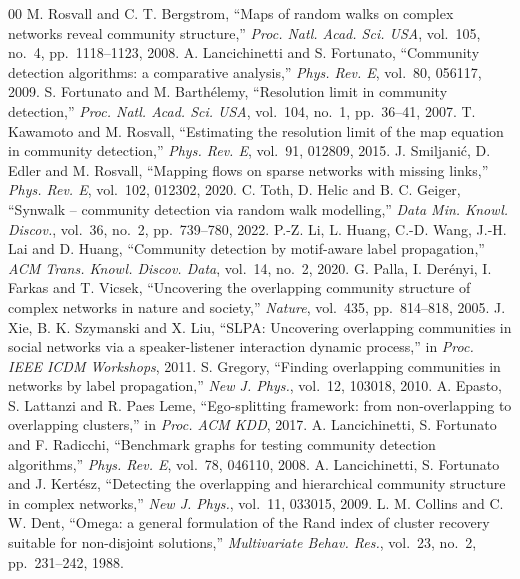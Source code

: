 \documentclass[conference]{IEEEtran}
\begin{document}
\begin{thebibliography}{00}
 M. Rosvall and C. T. Bergstrom, ``Maps of random walks on complex networks reveal community structure,'' \emph{Proc. Natl. Acad. Sci. USA}, vol.~105, no.~4, pp.~1118--1123, 2008.
 A. Lancichinetti and S. Fortunato, ``Community detection algorithms: a comparative analysis,'' \emph{Phys. Rev. E}, vol.~80, 056117, 2009.
 S. Fortunato and M. Barth\'elemy, ``Resolution limit in community detection,'' \emph{Proc. Natl. Acad. Sci. USA}, vol.~104, no.~1, pp.~36--41, 2007.
 T. Kawamoto and M. Rosvall, ``Estimating the resolution limit of the map equation in community detection,'' \emph{Phys. Rev. E}, vol.~91, 012809, 2015.
 J. Smiljani\'c, D. Edler and M. Rosvall, ``Mapping flows on sparse networks with missing links,'' \emph{Phys. Rev. E}, vol.~102, 012302, 2020.
 C. Toth, D. Helic and B. C. Geiger, ``Synwalk -- community detection via random walk modelling,'' \emph{Data Min. Knowl. Discov.}, vol.~36, no.~2, pp.~739--780, 2022.
 P.-Z. Li, L. Huang, C.-D. Wang, J.-H. Lai and D. Huang, ``Community detection by motif-aware label propagation,'' \emph{ACM Trans. Knowl. Discov. Data}, vol.~14, no.~2, 2020.
 G. Palla, I. Der\'enyi, I. Farkas and T. Vicsek, ``Uncovering the overlapping community structure of complex networks in nature and society,'' \emph{Nature}, vol.~435, pp.~814--818, 2005.
 J. Xie, B. K. Szymanski and X. Liu, ``SLPA: Uncovering overlapping communities in social networks via a speaker-listener interaction dynamic process,'' in \emph{Proc. IEEE ICDM Workshops}, 2011.
 S. Gregory, ``Finding overlapping communities in networks by label propagation,'' \emph{New J. Phys.}, vol.~12, 103018, 2010.
 A. Epasto, S. Lattanzi and R. Paes Leme, ``Ego-splitting framework: from non-overlapping to overlapping clusters,'' in \emph{Proc. ACM KDD}, 2017.
 A. Lancichinetti, S. Fortunato and F. Radicchi, ``Benchmark graphs for testing community detection algorithms,'' \emph{Phys. Rev. E}, vol.~78, 046110, 2008.
 A. Lancichinetti, S. Fortunato and J. Kert\'esz, ``Detecting the overlapping and hierarchical community structure in complex networks,'' \emph{New J. Phys.}, vol.~11, 033015, 2009.
 L. M. Collins and C. W. Dent, ``Omega: a general formulation of the Rand index of cluster recovery suitable for non-disjoint solutions,'' \emph{Multivariate Behav. Res.}, vol.~23, no.~2, pp.~231--242, 1988.

\end{thebibliography}
\end{document}
